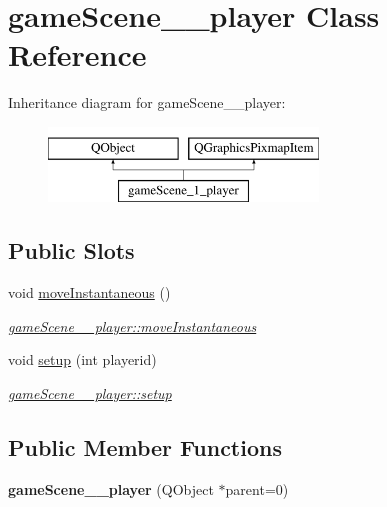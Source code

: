 \hypertarget{classgameScene__1__player}{\section{game\-Scene\-\_\-\_\-player Class Reference}
\label{classgameScene__1__player}
}
Inheritance diagram for game\-Scene\-\_\-\_\-player\-:\begin{figure}[H]
\begin{center}
\leavevmode
\includegraphics[height=2.000000cm]{classgameScene__1__player}
\end{center}
\end{figure}
\subsection*{Public Slots}
\begin{DoxyCompactItemize}
\item 
void \hyperlink{classgameScene__1__player_a3853a587d2dab9fcaa90f2c614e27b16}{move\-Instantaneous} ()
\begin{DoxyCompactList}\small\item\em \hyperlink{classgameScene__1__player_a3853a587d2dab9fcaa90f2c614e27b16}{game\-Scene\-\_\-\_\-player\-::move\-Instantaneous} \end{DoxyCompactList}\item 
void \hyperlink{classgameScene__1__player_a00915de85128384e57721fb4b4f1b84c}{setup} (int playerid)
\begin{DoxyCompactList}\small\item\em \hyperlink{classgameScene__1__player_a00915de85128384e57721fb4b4f1b84c}{game\-Scene\-\_\-\_\-player\-::setup} \end{DoxyCompactList}\end{DoxyCompactItemize}
\subsection*{Public Member Functions}
\begin{DoxyCompactItemize}
\item 
\hypertarget{classgameScene__1__player_a406e5938fd1904873a812106b8a68eb7}{{\bfseries game\-Scene\-\_\-\_\-player} (Q\-Object $\ast$parent=0)}\label{classgameScene__1__player_a406e5938fd1904873a812106b8a68eb7}

\end{DoxyCompactItemize}
